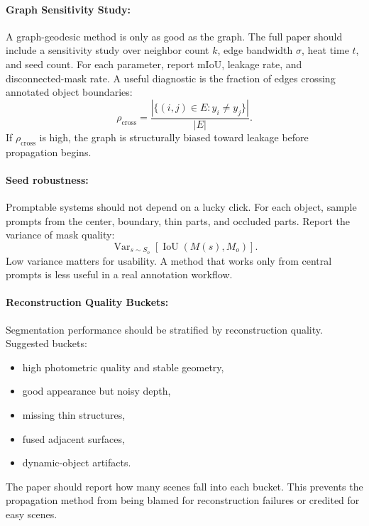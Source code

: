 \documentclass{article}
\begin{document}
\paragraph{Graph Sensitivity Study:}

A graph-geodesic method is only as good as the graph. The full paper should include a sensitivity study over neighbor count $k$, edge bandwidth $\sigma$, heat time $t$, and seed count. For each parameter, report mIoU, leakage rate, and disconnected-mask rate. A useful diagnostic is the fraction of edges crossing annotated object boundaries:
\begin{equation}
  \rho_{\text{cross}}=\frac{|\{(i,j)\in E:y_i\neq y_j\}|}{|E|}.
\end{equation}
If $\rho_{\text{cross}}$ is high, the graph is structurally biased toward leakage before propagation begins.

\paragraph{Seed robustness:}

Promptable systems should not depend on a lucky click. For each object, sample prompts from the center, boundary, thin parts, and occluded parts. Report the variance of mask quality:
\begin{equation}
  \operatorname{Var}_{s\sim S_o}[\operatorname{IoU}(M(s),M_o)].
\end{equation}
Low variance matters for usability. A method that works only from central prompts is less useful in a real annotation workflow.

\paragraph{Reconstruction Quality Buckets:}

Segmentation performance should be stratified by reconstruction quality. Suggested buckets:
\begin{itemize}
  \item high photometric quality and stable geometry,
  \item good appearance but noisy depth,
  \item missing thin structures,
  \item fused adjacent surfaces,
  \item dynamic-object artifacts.
\end{itemize}
The paper should report how many scenes fall into each bucket. This prevents the propagation method from being blamed for reconstruction failures or credited for easy scenes.
\end{document}
